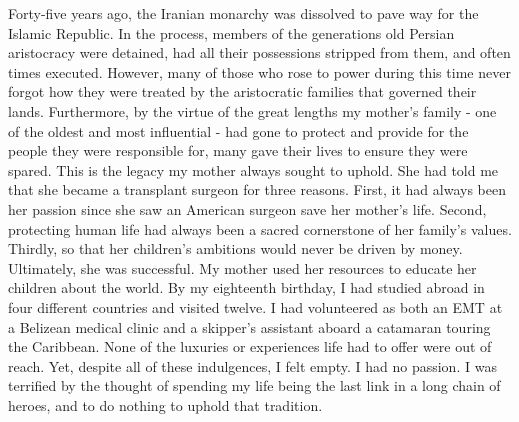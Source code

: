 \documentclass[10pt]{article}
\begin{document}
\author{Armon Shariati}
\title{}
\date{}
\maketitle

Forty-five years ago, the Iranian monarchy was dissolved to pave way for the
Islamic Republic. In the process, members of the generations old Persian
aristocracy were detained, had all their possessions stripped from them, and
often times executed. However, many of those who rose to power during this time
never forgot how they were treated by the aristocratic families that governed
their lands. Furthermore, by the virtue of the great lengths my mother's family
- one of the oldest and most influential - had gone to protect and provide for
the people they were responsible for, many gave their lives to ensure they were
spared. This is the legacy my mother always sought to uphold. She had told me
that she became a transplant surgeon for three reasons. First, it had always
been her passion since she saw an American surgeon save her mother's life.
Second, protecting human life had always been a sacred cornerstone of her
family's values. Thirdly, so that her children's ambitions would never be
driven by money. Ultimately, she was successful. My mother used her resources
to educate her children about the world.  By my eighteenth birthday, I had
studied abroad in four different countries and visited twelve. I had
volunteered as both an EMT at a Belizean medical clinic and a skipper's
assistant aboard a catamaran touring the Caribbean.  None of the luxuries or
experiences life had to offer were out of reach. Yet, despite all of these
indulgences, I felt empty. I had no passion.  I was terrified by the thought of
spending my life being the last link in a long chain of heroes, and to do
nothing to uphold that tradition.
\end{document}
